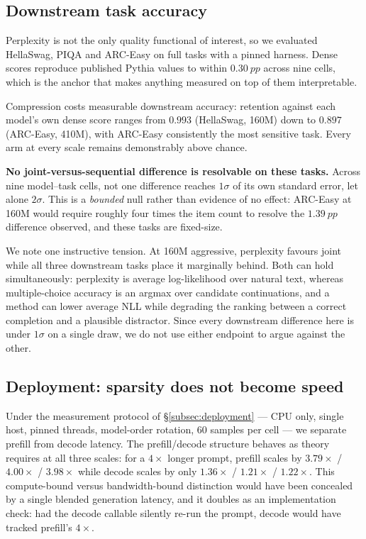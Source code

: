 \subsection{Downstream task accuracy}
\label{subsec:downstream}

Perplexity is not the only quality functional of interest, so we evaluated HellaSwag, PIQA
and ARC-Easy on full tasks with a pinned harness. Dense scores reproduce published Pythia
values to within $\SI{0.30}{pp}$ across nine cells, which is the anchor that makes anything
measured on top of them interpretable.

Compression costs measurable downstream accuracy: retention against each model's own dense
score ranges from $0.993$ (HellaSwag, 160M) down to $0.897$ (ARC-Easy, 410M), with ARC-Easy
consistently the most sensitive task. Every arm at every scale remains demonstrably above
chance.

\textbf{No joint-versus-sequential difference is resolvable on these tasks.} Across nine
model--task cells, not one difference reaches $1\sigma$ of its own standard error, let alone
$2\sigma$. This is a \emph{bounded} null rather than evidence of no effect: ARC-Easy at 160M
would require roughly four times the item count to resolve the $\SI{1.39}{pp}$ difference
observed, and these tasks are fixed-size.

We note one instructive tension. At 160M aggressive, perplexity favours joint while all three
downstream tasks place it marginally behind. Both can hold simultaneously: perplexity is
average log-likelihood over natural text, whereas multiple-choice accuracy is an argmax over
candidate continuations, and a method can lower average NLL while degrading the ranking
between a correct completion and a plausible distractor. Since every downstream difference
here is under $1\sigma$ on a single draw, we do not use either endpoint to argue against the
other.

\subsection{Deployment: sparsity does not become speed}
\label{subsec:latency}

Under the measurement protocol of \S\ref{subsec:deployment} --- CPU only, single host, pinned
threads, model-order rotation, 60 samples per cell --- we separate prefill from decode
latency. The prefill/decode structure behaves as theory requires at all three scales: for a
$4\times$ longer prompt, prefill scales by $3.79\times$ / $4.00\times$ / $3.98\times$ while
decode scales by only $1.36\times$ / $1.21\times$ / $1.22\times$. This compute-bound versus
bandwidth-bound distinction would have been concealed by a single blended generation latency,
and it doubles as an implementation check: had the decode callable silently re-run the
prompt, decode would have tracked prefill's $4\times$.

